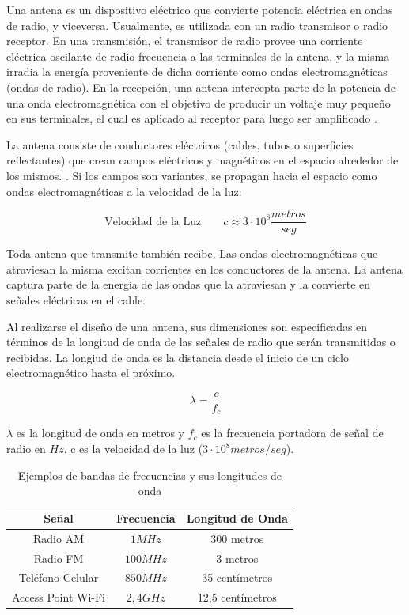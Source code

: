 Una antena es un dispositivo eléctrico que convierte potencia eléctrica en ondas de radio, y viceversa. Usualmente, es utilizada con un radio transmisor o radio receptor. En una transmisión, el transmisor de radio provee una corriente eléctrica oscilante de radio frecuencia a las terminales de la antena, y la misma irradia la energía proveniente de dicha corriente como ondas electromagnéticas (ondas de radio). En la recepción, una antena intercepta parte de la potencia de una onda electromagnética con el objetivo de producir un voltaje muy pequeño en sus terminales, el cual es aplicado al receptor para luego ser amplificado \cite{Wiki_Antenna}.

La antena consiste de conductores eléctricos (cables, tubos o superficies reflectantes) que crean campos eléctricos y magnéticos en el espacio alrededor de los mismos. \cite{Haynes}. Si los campos son variantes, se propagan hacia el espacio como ondas electromagnéticas a la velocidad de la luz:

\begin{equation}
\text{Velocidad de la Luz} \qquad  c \approx 3 \cdot 10^8 \frac{metros}{seg}
\end{equation}

Toda antena que transmite también recibe. Las ondas electromagnéticas que atraviesan la misma excitan corrientes en los conductores de la antena. La antena captura parte de la energía de las ondas que la atraviesan y la convierte en señales eléctricas en el cable.

Al realizarse el diseño de una antena, sus dimensiones son especificadas en términos de la longitud de onda de las señales de radio que serán transmitidas o recibidas. La longiud de onda es la distancia desde el inicio de un ciclo electromagnético hasta el próximo.

\begin{equation}
\lambda = \frac{c}{f_c}
\end{equation}

$\lambda$ es la longitud de onda en metros y $f_c$ es la frecuencia portadora de señal de radio en $Hz$. c es la velocidad de la luz ($3 \cdot 10^8 metros/seg$).


\begin{table}[htb!]
    \begin{center}
        \begin{tabular}{|c|c|c|}
        \hline  
        \textbf{Señal} & \textbf{Frecuencia} & \textbf{Longitud de Onda} \\
        \hline  
        Radio AM & $1 MHz$ & 300 metros \\
        \hline
        Radio FM & $100 MHz$ & 3 metros \\
        \hline
        Teléfono Celular & $850 MHz$ & 35 centímetros \\
        \hline
        Access Point Wi-Fi & $2,4 GHz$ & 12,5 centímetros \\
        \hline
        \end{tabular}
        \caption{Ejemplos de bandas de frecuencias y sus longitudes de onda}
    \end{center}
\end{table}


